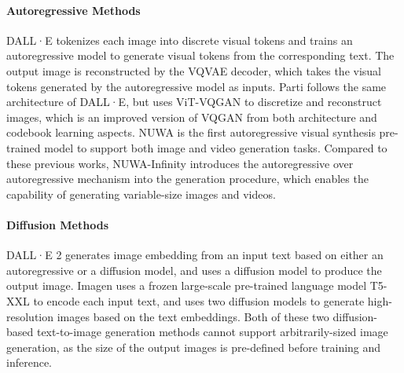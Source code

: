\documentclass{article}
\begin{document}

\paragraph{Autoregressive Methods}
DALL·E \cite{rameshZeroShotTexttoImageGeneration2021} tokenizes each image into discrete visual tokens and trains an autoregressive model to generate visual tokens from the corresponding text. The output image is reconstructed by the VQVAE decoder, which takes the visual tokens generated by the autoregressive model as inputs.     
Parti \cite{yuScalingAutoregressiveModels2022} follows the same architecture of DALL·E, but uses ViT-VQGAN \cite{yuVectorquantizedImageModeling2022} to discretize and reconstruct images, which is an improved version of VQGAN from both architecture and codebook learning aspects.
NUWA \cite{wuUWAVisualSynthesis2022} is the first autoregressive visual synthesis pre-trained model to support both image and video generation tasks. 
Compared to these previous works, NUWA-Infinity introduces the autoregressive over autoregressive mechanism into the generation procedure, which enables the capability of generating variable-size images and videos. 

\paragraph{Diffusion Methods}
DALL·E 2 \cite{rameshHierarchicalTextConditionalImage2022} generates image embedding from an input text based on either an autoregressive or a diffusion model, and uses a diffusion model to produce the output image.
Imagen \cite{sahariaPhotorealisticTexttoImageDiffusion2022} uses a frozen large-scale pre-trained language model T5-XXL \cite{raffelExploringLimitsTransfer2020} to encode each input text, and uses two diffusion models to generate high-resolution images based on the text embeddings.
Both of these two diffusion-based text-to-image generation methods cannot support arbitrarily-sized image generation, as the size of the output images is pre-defined before training and inference.


\end{document}
